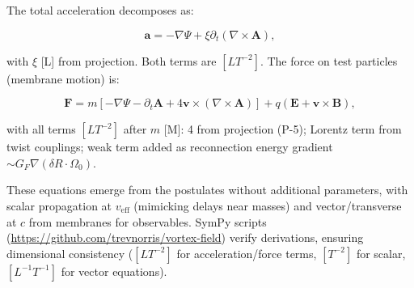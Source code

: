 The total acceleration decomposes as:

\begin{equation}
\mathbf{a} = -\nabla \Psi + \xi \partial_t (\nabla \times \mathbf{A}),
\end{equation}

with $\xi$ [L] from projection. Both terms are $[L T^{-2}]$. The force on test particles (membrane motion) is:

\begin{equation}
\mathbf{F} = m \left[ -\nabla \Psi - \partial_t \mathbf{A} + 4 \mathbf{v} \times (\nabla \times \mathbf{A}) \right] + q \left( \mathbf{E} + \mathbf{v} \times \mathbf{B} \right),
\end{equation}

with all terms $[L T^{-2}]$ after $m$ [M]: 4 from projection (P-5); Lorentz term from twist couplings; weak term added as reconnection energy gradient $\sim G_F \nabla (\delta R \cdot \Omega_0)$.

These equations emerge from the postulates without additional parameters, with scalar propagation at $v_{\text{eff}}$ (mimicking delays near masses) and vector/transverse at $c$ from membranes for observables. SymPy scripts (\url{https://github.com/trevnorris/vortex-field}) verify derivations, ensuring dimensional consistency ($[L T^{-2}]$ for acceleration/force terms, $[T^{-2}]$ for scalar, $[L^{-1} T^{-1}]$ for vector equations).

\medskip
\noindent
{}
\medskip


